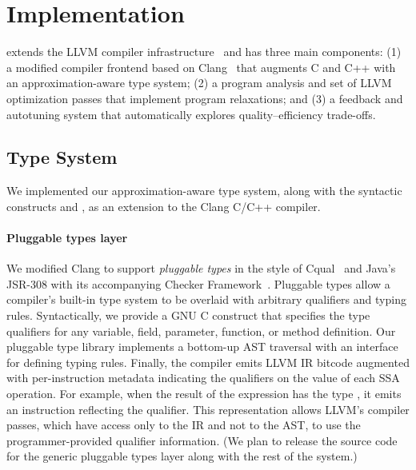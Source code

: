 \section{Implementation}
\label{accept:sec:impl}

\sysname extends the LLVM compiler
infrastructure~\cite{llvm} and has three main components:
(1) a modified compiler frontend based on Clang~\cite{clang}
that augments C and C++ with an
approximation-aware type system;
(2) a program analysis and set of LLVM optimization passes that implement
program relaxations; and
(3) a feedback and autotuning system that automatically explores
quality--efficiency trade-offs.

\subsection{Type System}

We implemented our approximation-aware type system, along with the syntactic
constructs  and , as an extension to the Clang
C/C++ compiler.

\paragraph{Pluggable types layer}

We modified Clang to support \emph{pluggable types} in the style of
Cqual~\cite{cqual} and Java's JSR-308 with its accompanying Checker
Framework~\cite{jsr308, papi}.
Pluggable types allow a compiler's built-in type system to be overlaid with
arbitrary qualifiers and typing rules. Syntactically, we
provide a GNU C  construct that specifies the
type qualifiers for any variable, field, parameter, function, or method
definition. Our pluggable type library implements a bottom-up AST traversal
with an interface for defining typing rules.
Finally, the compiler emits LLVM IR bitcode
augmented with per-instruction metadata indicating the qualifiers on the
value of each SSA operation. For example, when the result of the
expression  has the type , it emits an
 instruction reflecting the qualifier. This
representation allows LLVM's compiler passes, which have access only to the IR
and not to the AST, to use the programmer-provided qualifier
information.
(We plan to release the source code for the generic
pluggable types layer along with the rest of the
system.)


